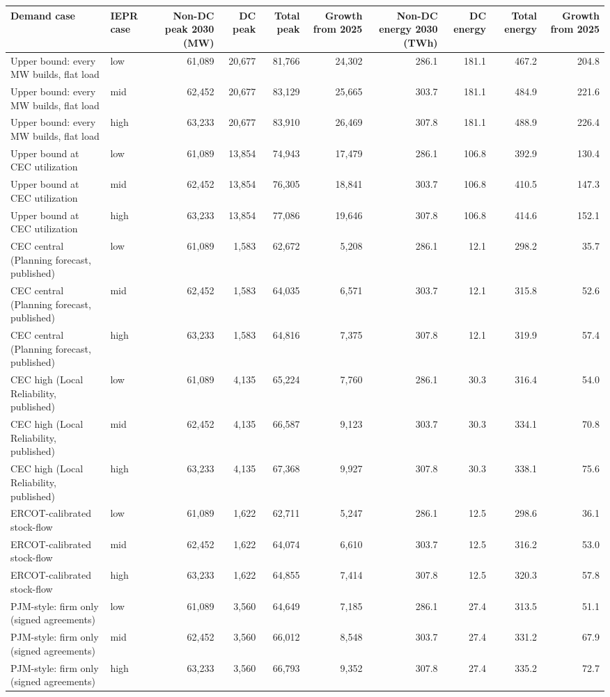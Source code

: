 \begin{tabular}{llrrrrrrrr}
\toprule
Demand case & IEPR case & Non-DC peak 2030 (MW) & DC peak & Total peak & Growth from 2025 & Non-DC energy 2030 (TWh) & DC energy & Total energy & Growth from 2025 \\
\midrule
Upper bound: every MW builds, flat load & low & 61,089 & 20,677 & 81,766 & 24,302 & 286.1 & 181.1 & 467.2 & 204.8 \\
Upper bound: every MW builds, flat load & mid & 62,452 & 20,677 & 83,129 & 25,665 & 303.7 & 181.1 & 484.9 & 221.6 \\
Upper bound: every MW builds, flat load & high & 63,233 & 20,677 & 83,910 & 26,469 & 307.8 & 181.1 & 488.9 & 226.4 \\
\addlinespace
Upper bound at CEC utilization & low & 61,089 & 13,854 & 74,943 & 17,479 & 286.1 & 106.8 & 392.9 & 130.4 \\
Upper bound at CEC utilization & mid & 62,452 & 13,854 & 76,305 & 18,841 & 303.7 & 106.8 & 410.5 & 147.3 \\
Upper bound at CEC utilization & high & 63,233 & 13,854 & 77,086 & 19,646 & 307.8 & 106.8 & 414.6 & 152.1 \\
\addlinespace
CEC central (Planning forecast, published) & low & 61,089 & 1,583 & 62,672 & 5,208 & 286.1 & 12.1 & 298.2 & 35.7 \\
CEC central (Planning forecast, published) & mid & 62,452 & 1,583 & 64,035 & 6,571 & 303.7 & 12.1 & 315.8 & 52.6 \\
CEC central (Planning forecast, published) & high & 63,233 & 1,583 & 64,816 & 7,375 & 307.8 & 12.1 & 319.9 & 57.4 \\
\addlinespace
CEC high (Local Reliability, published) & low & 61,089 & 4,135 & 65,224 & 7,760 & 286.1 & 30.3 & 316.4 & 54.0 \\
CEC high (Local Reliability, published) & mid & 62,452 & 4,135 & 66,587 & 9,123 & 303.7 & 30.3 & 334.1 & 70.8 \\
CEC high (Local Reliability, published) & high & 63,233 & 4,135 & 67,368 & 9,927 & 307.8 & 30.3 & 338.1 & 75.6 \\
\addlinespace
ERCOT-calibrated stock-flow & low & 61,089 & 1,622 & 62,711 & 5,247 & 286.1 & 12.5 & 298.6 & 36.1 \\
ERCOT-calibrated stock-flow & mid & 62,452 & 1,622 & 64,074 & 6,610 & 303.7 & 12.5 & 316.2 & 53.0 \\
ERCOT-calibrated stock-flow & high & 63,233 & 1,622 & 64,855 & 7,414 & 307.8 & 12.5 & 320.3 & 57.8 \\
\addlinespace
PJM-style: firm only (signed agreements) & low & 61,089 & 3,560 & 64,649 & 7,185 & 286.1 & 27.4 & 313.5 & 51.1 \\
PJM-style: firm only (signed agreements) & mid & 62,452 & 3,560 & 66,012 & 8,548 & 303.7 & 27.4 & 331.2 & 67.9 \\
PJM-style: firm only (signed agreements) & high & 63,233 & 3,560 & 66,793 & 9,352 & 307.8 & 27.4 & 335.2 & 72.7 \\
\bottomrule
\end{tabular}